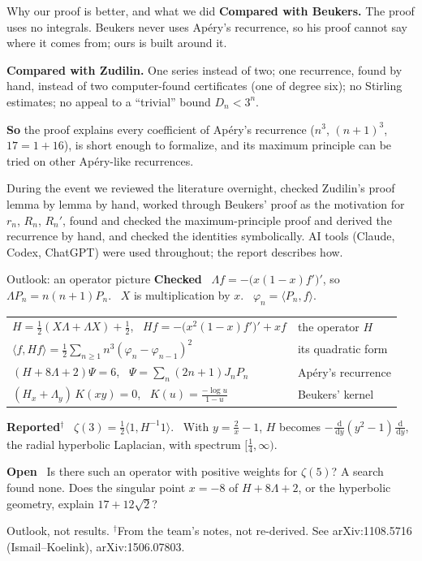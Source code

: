 \documentclass[aspectratio=169,11pt]{beamer}
\newcommand{\dd}{\,\mathrm{d}}
\begin{document}
\begin{frame}{Why our proof is better, and what we did}
  \textbf{Compared with Beukers.} The proof uses no integrals. Beukers never uses Ap\'ery's
  recurrence, so his proof cannot say where it comes from; ours is built around it.

  \textbf{Compared with Zudilin.} One series instead of two; one recurrence, found by hand,
  instead of two computer-found certificates (one of degree six); no Stirling estimates; no
  appeal to a ``trivial'' bound $D_n<3^n$.

  \textbf{So} the proof explains every coefficient of Ap\'ery's recurrence ($n^3$, $(n+1)^3$,
  $17=1+16$), is short enough to formalize, and its maximum principle can be tried on other
  Ap\'ery-like recurrences.

  {\footnotesize During the event we reviewed the literature overnight, checked Zudilin's proof lemma by
  lemma by hand, worked through Beukers' proof as the motivation for $r_n$, $R_n$, $R_n'$, found
  and checked the maximum-principle proof and derived the recurrence by hand, and checked the
  identities symbolically. AI tools (Claude, Codex, ChatGPT) were used throughout; the report
  describes how.\par}
\end{frame}

\begin{frame}{Outlook: an operator picture}
  \small
  \textbf{\color{mDarkTeal}Checked} \
  $\Lambda f=-\bigl(x(1-x)f'\bigr)'$, so $\Lambda P_n=n(n+1)P_n$. \ $X$ is multiplication by $x$. \ $\varphi_n=\langle P_n,f\rangle$.

  \renewcommand{\arraystretch}{1.2}
  \begin{tabular}{@{}l@{\quad}l@{}}
    $H=\tfrac12(X\Lambda+\Lambda X)+\tfrac12$, \ $Hf=-\bigl(x^2(1-x)f'\bigr)'+xf$ & the operator $H$\\
    $\langle f,Hf\rangle=\tfrac12\sum_{n\ge1}n^3(\varphi_n-\varphi_{n-1})^2$ & its quadratic form\\
    $(H+8\Lambda+2)\Psi=6$, \ $\Psi=\sum_n(2n+1)J_nP_n$ & Ap\'ery's recurrence\\
    $(H_x+\Lambda_y)\,K(xy)=0$, \ $K(u)=\frac{-\log u}{1-u}$ & Beukers' kernel
  \end{tabular}

  \textbf{\color{mLightBrown}Reported$^\dagger$} \
  $\zeta(3)=\tfrac12\langle1,H^{-1}1\rangle$. \ With $y=\frac2x-1$, $H$ becomes
  $-\frac{\dd}{\dd y}(y^2-1)\frac{\dd}{\dd y}$, the radial hyperbolic Laplacian, with spectrum
  $[\frac14,\infty)$.

  \textbf{\color{mLightBrown}Open} \
  Is there such an operator with positive weights for $\zeta(5)$? A search found none.
  Does the singular point $x=-8$ of $H+8\Lambda+2$, or the hyperbolic geometry, explain $17+12\sqrt2$?

  {\footnotesize Outlook, not results. $^\dagger$From the team's notes, not re-derived.
  See arXiv:1108.5716 (Ismail--Koelink), arXiv:1506.07803.}
\end{frame}
\end{document}
